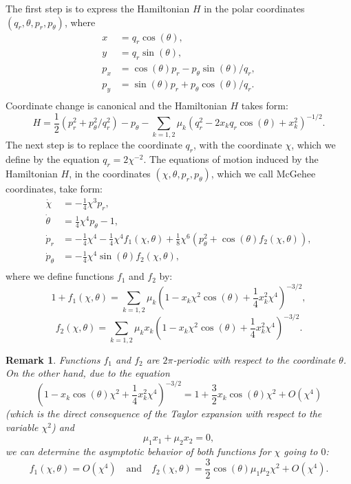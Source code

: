 \documentclass[1p]{article}
\newtheorem{remark}{Remark}
\begin{document}
The first step is to express the Hamiltonian $H$ in the polar coordinates $(q_r,\theta,p_r,p_\theta)$, where
\begin{equation*}
    \begin{split}
        x &= q_r \cos(\theta), \\
        y &= q_r \sin(\theta), \\
        p_x &= \cos(\theta) p_r - p_\theta \sin(\theta) / q_r, \\
        p_y &= \sin(\theta) p_r + p_\theta \cos(\theta) / q_r. \\
    \end{split}
\end{equation*}
Coordinate change is canonical and the Hamiltonian $H$ takes form:
\[
    H = \frac{1}{2} \left(p_r^2 + p_\theta^2/q_r^2 \right) - p_\theta - \sum_{k=1,2} \mu_k \left( q_r^2 - 2x_k q_r \cos(\theta) + x_k^2 \right)^{-1/2}.
\]
The next step is to replace the coordinate $q_r$, with the coordinate $\chi$, which we define by the equation $q_r = 2 \chi^{-2}$. The equations of motion induced by the Hamiltonian $H$, in the coordinates $(\chi, \theta, p_r, p_\theta)$, which we call McGehee coordinates, take form: 
\begin{equation}
    \label{eq:vector_field_mcgehee_short}
    \begin{split}
        \dot{\chi} &= -\frac{1}{4} \chi^3 p_r, \\
        \dot{\theta} &= \frac{1}{4} \chi^4 p_\theta - 1, \\
        \dot{p}_r &=
            -\frac{1}{4} \chi^4 -\frac{1}{4} \chi^4 f_1(\chi, \theta) + \frac{1}{8} \chi^6 \left( p_\theta^2 + \cos(\theta) f_2(\chi, \theta) \right), \\
        \dot{p}_\theta &= - \frac{1}{4} \chi^4 \sin(\theta) f_2 (\chi, \theta), \\
    \end{split}
\end{equation}
where we define functions $f_1$ and $f_2$ by:
\begin{equation}
    1 + f_1 (\chi, \theta) = \sum_{k=1,2} \mu_k \left(1 - x_k \chi^2 \cos(\theta) + \frac{1}{4} x_k^2 \chi^4 \right)^{-3/2},
\end{equation}
\begin{equation}
    f_2 (\chi, \theta) = \sum_{k=1,2} \mu_k x_k \left(1 - x_k \chi^2 \cos(\theta) + \frac{1}{4} x_k^2 \chi^4 \right)^{-3/2}.
\end{equation}
\begin{remark}
    Functions $f_1$ and $f_2$ are $2\pi$-periodic with respect to the coordinate $\theta$. On the other hand, due to the equation
    \[
        \left(1 - x_k \cos(\theta) \chi^2 + \frac{1}{4} x_k^2 \chi^4 \right)^{-3/2} = 1 + \frac{3}{2} x_k \cos(\theta) \chi^2 + O(\chi^4)
    \]
    (which is the direct consequence of the Taylor expansion with respect to the variable $\chi^2$) and
    \[
        \mu_1 x_1 + \mu_2 x_2 = 0,
    \]
    we can determine the asymptotic behavior of both functions for $\chi$ going to $0$:
    \[
        f_1 (\chi,\theta) = O(\chi^4) \quad\text{and}\quad
        f_2 (\chi,\theta) = \frac{3}{2} \cos(\theta) \mu_1 \mu_2 \chi^2 + O(\chi^4).
    \]
\end{remark}
\end{document}
